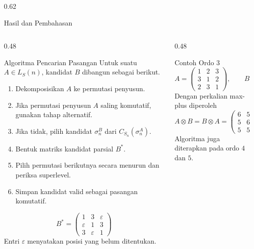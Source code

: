 \documentclass[final]{beamer}
\newcommand{\LS}{L_S(n)}
\newcommand{\Sn}{S_n}
\newcommand{\eps}{\varepsilon}
\begin{document}
\begin{frame}[t]
\begin{columns}[t]
\begin{column}{0.62\paperwidth}
\begin{block}{Hasil dan Pembahasan}
				\begin{columns}[t]
					\begin{column}{0.48\linewidth}
						\begin{exampleblock}{Algoritma Pencarian Pasangan}
							Untuk suatu $A\in\LS$, kandidat $B$ dibangun sebagai berikut.
							\begin{enumerate}
								\item Dekomposisikan $A$ ke permutasi penyusun.
								\item Jika permutasi penyusun $A$ saling komutatif, gunakan tahap alternatif.
								\item Jika tidak, pilih kandidat $\sigma_n^B$ dari $C_{\Sn}(\sigma_n^A)$.
								\item Bentuk matriks kandidat parsial $B^*$.
								\item Pilih permutasi berikutnya secara menurun dan periksa superlevel.
								\item Simpan kandidat valid sebagai pasangan komutatif.
							\end{enumerate}

							\[
								B^*=
								\begin{pmatrix}
									1    & 3    & \eps \\
									\eps & 1    & 3    \\
									3    & \eps & 1
								\end{pmatrix}
							\]
							Entri $\eps$ menyatakan posisi yang belum ditentukan.
						\end{exampleblock}
					\end{column}

					\begin{column}{0.48\linewidth}
						\begin{exampleblock}{Contoh Ordo 3}
							\[
								A=
								\begin{pmatrix}
									1 & 2 & 3 \\
									3 & 1 & 2 \\
									2 & 3 & 1
								\end{pmatrix},
								\qquad
								B=
								\begin{pmatrix}
									1 & 3 & 2 \\
									2 & 1 & 3 \\
									3 & 2 & 1
								\end{pmatrix}.
							\]
							Dengan perkalian max-plus diperoleh
							\[
								A\otimes B
								=
								B\otimes A
								=
								\begin{pmatrix}
									6 & 5 & 5 \\
									5 & 6 & 5 \\
									5 & 5 & 6
								\end{pmatrix}.
							\]
							Algoritma juga diterapkan pada ordo $4$ dan $5$.
						\end{exampleblock}
					\end{column}
				\end{columns}
			\end{block}


\end{column}
\end{columns}
\end{frame}
\end{document}

